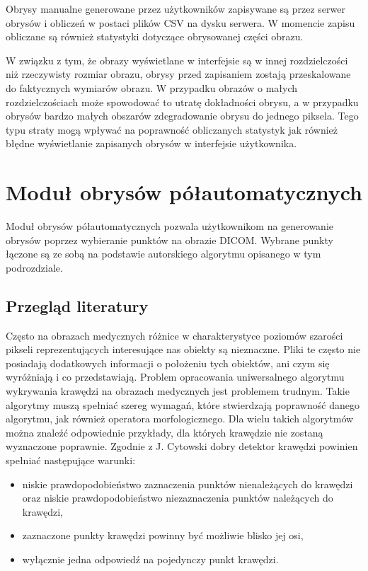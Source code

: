 \documentclass[a4paper,11pt,twoside,openright]{report}
\theoremstyle{definition}
\begin{document}
Obrysy manualne generowane przez użytkowników zapisywane są przez serwer obrysów
i obliczeń w postaci plików CSV na dysku serwera. W momencie zapisu obliczane są
również statystyki dotyczące obrysowanej części obrazu.

W związku z tym, że obrazy wyświetlane w interfejsie są w innej rozdzielczości
niż rzeczywisty rozmiar obrazu, obrysy przed zapisaniem zostają przeskalowane do
faktycznych wymiarów obrazu. W przypadku obrazów o małych rozdzielczościach może
spowodować to utratę dokładności obrysu, a w przypadku obrysów bardzo małych
obszarów zdegradowanie obrysu do jednego piksela. Tego typu straty mogą wpływać
na poprawność obliczanych statystyk jak również błędne wyświetlanie zapisanych
obrysów w interfejsie użytkownika.

\section {Moduł obrysów półautomatycznych}

Moduł obrysów półautomatycznych pozwala użytkownikom na generowanie
obrysów poprzez wybieranie punktów na obrazie DICOM. Wybrane punkty łączone są
ze sobą na podstawie autorskiego algorytmu opisanego w tym podrozdziale.

\subsection {Przegląd literatury}

Często na obrazach medycznych różnice w charakterystyce poziomów szarości pikseli
reprezentujących interesujące nas obiekty są nieznaczne. Pliki te często nie posiadają
dodatkowych informacji o położeniu tych obiektów, ani czym się wyróżniają i co przedstawiają.
Problem opracowania uniwersalnego algorytmu wykrywania krawędzi na obrazach medycznych
jest problemem trudnym. Takie algorytmy muszą spełniać szereg wymagań,
które stwierdzają poprawność danego algorytmu, jak również operatora morfologicznego.
Dla wielu takich algorytmów można znaleźć odpowiednie przykłady,
dla których krawędzie nie zostaną wyznaczone poprawnie. Zgodnie z J. Cytowski \cite{Cyfrowe przetwarzanie
obrazów medycznych} dobry detektor krawędzi powinien spełniać następujące warunki:
\begin{itemize}[noitemsep]
\item {niskie prawdopodobieństwo zaznaczenia punktów nienależących do krawędzi
oraz niskie prawdopodobieństwo niezaznaczenia punktów należących do krawędzi,}
\item {zaznaczone punkty krawędzi powinny być możliwie blisko jej osi,}
\item {wyłącznie jedna odpowiedź na pojedynczy punkt krawędzi.}
\end{itemize}
\end{document}
